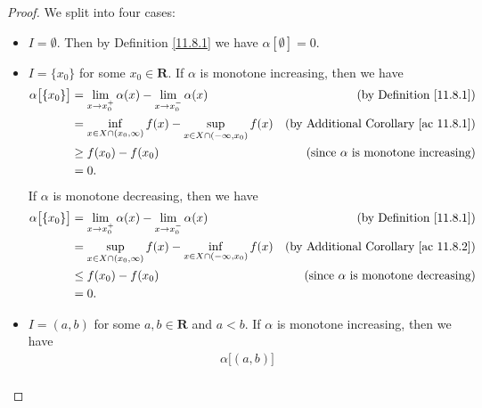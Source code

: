 \begin{proof}
    We split into four cases:
    \begin{itemize}
        \item \(I = \emptyset\).
              Then by Definition \ref{11.8.1} we have \(\alpha[\emptyset] = 0\).
        \item \(I = \{x_0\}\) for some \(x_0 \in \mathbf{R}\).
              If \(\alpha\) is monotone increasing, then we have
              \begin{align*}
                  \alpha\big[\{x_0\}\big] & = \lim_{x \to x_0^+} \alpha(x) - \lim_{x \to x_0^-} \alpha(x)                      & \text{(by Definition \ref{11.8.1})}              \\
                                          & = \inf_{x \in X \cap (x_0, \infty)} f(x) - \sup_{x \in X \cap (-\infty, x_0)} f(x) & \text{(by Additional Corollary \ref{ac 11.8.1})} \\
                                          & \geq f(x_0) - f(x_0)                                                               & \text{(since \(\alpha\) is monotone increasing)} \\
                                          & = 0.
              \end{align*}
              If \(\alpha\) is monotone decreasing, then we have
              \begin{align*}
                  \alpha\big[\{x_0\}\big] & = \lim_{x \to x_0^+} \alpha(x) - \lim_{x \to x_0^-} \alpha(x)                      & \text{(by Definition \ref{11.8.1})}              \\
                                          & = \sup_{x \in X \cap (x_0, \infty)} f(x) - \inf_{x \in X \cap (-\infty, x_0)} f(x) & \text{(by Additional Corollary \ref{ac 11.8.2})} \\
                                          & \leq f(x_0) - f(x_0)                                                               & \text{(since \(\alpha\) is monotone decreasing)} \\
                                          & = 0.
              \end{align*}
        \item \(I = (a, b)\) for some \(a, b \in \mathbf{R}\) and \(a < b\).
              If \(\alpha\) is monotone increasing, then we have
              \begin{align*}
                   & \alpha\big[(a, b)\big]                                                                                                                                \\

\end{align*}
\end{itemize}
\end{proof}
